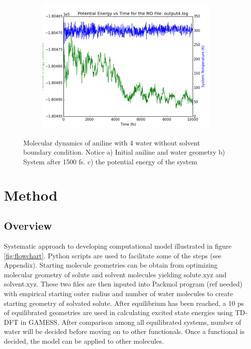\documentclass[
journal=jpcbfk, %
manuscript=article]{achemso}
\begin{document}
\begin{figure}[!tbp]
	\begin{subfigure}[b]{0.4\textwidth}
		\includegraphics[width=1\textwidth]{wB97XD/output4_log_EnergyPlot.png}
		\caption{}
		\label{fig:aniline4c)}
	\end{subfigure}
	\caption{Molecular dynamics of aniline with 4 water without solvent boundary condition. Notice  a) Initial aniline and water geometry b) System after 1500 fs. c) the potential energy of the system}
\end{figure}
\clearpage

\section{Method}
\subsection{Overview}
Systematic approach to developing computational model illustrated in figure \ref{fig:flowchart}. Python scripts are used to facilitate some of the steps (see Appendix). Starting molecule geometries can be obtain from optimizing molecular geometry of solute and solvent molecules yielding solute.xyz and solvent.xyz. These two files are then inputed into Packmol program (ref needed) with empirical starting outer radius and number of water molecules to create starting  geometry of solvated solute. After equilibrium has been reached, a 10 ps of equilibrated geometries are used in calculating excited state energies using TD-DFT in GAMESS. After comparison among all equilibrated systems, number of water will be decided before moving on to other functionals. Once a functional is decided, the model can be applied to other molecules. 
\end{document}
